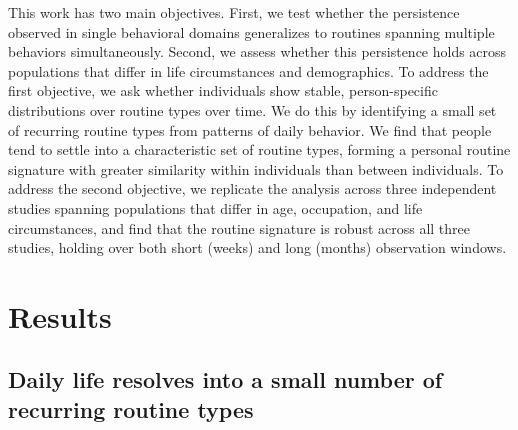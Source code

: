 \documentclass[pdflatex,sn-vancouver,Numbered]{bst/sn-jnl}%
\theoremstyle{thmstyleone}%
\theoremstyle{thmstyletwo}%
\theoremstyle{thmstylethree}%
\begin{document}
This work has two main objectives. First, we test whether the persistence observed in single behavioral domains generalizes to routines spanning multiple behaviors simultaneously. Second, we assess whether this persistence holds across populations that differ in life circumstances and demographics. To address the first objective, we ask whether individuals show stable, person-specific distributions over routine types over time. We do this by identifying a small set of recurring routine types from patterns of daily behavior. We find that people tend to settle into a characteristic set of routine types, forming a personal routine signature with greater similarity within individuals than between individuals. To address the second objective, we replicate the analysis across three independent studies spanning populations that differ in age, occupation, and life circumstances, and find that the routine signature is robust across all three studies, holding over both short (weeks) and long (months) observation windows.


\section*{Results}\label{sec:results}  

\subsection*{Daily life resolves into a small number of recurring routine types}
\end{document}
